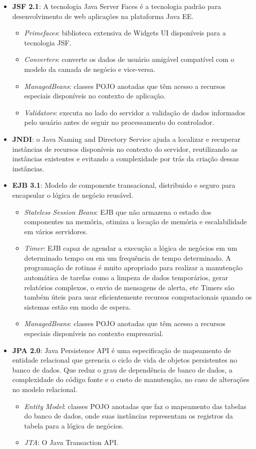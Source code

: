\documentclass[envcountsame,envcountchap,letterpaper]{svmono}
\begin{document}
\begin{itemize}
\item \textbf{JSF 2.1}: A tecnologia Java Server Faces é a tecnologia padrão para desenvolvimento de web aplicações na plataforma Java EE.
   \begin{itemize}
   \item \textit{Primefaces}: biblioteca extensiva de Widgets UI 
   disponíveis para a tecnologia JSF.
   \item \textit{Converters}: converte os dados de usuário amigável compatível com o modelo da camada de negócio e vice-versa. 
   \item \textit{ManagedBeans}: classes POJO anotadas que têm
   acesso a recursos especiais disponíveis no
   contexto de aplicação.
   \item \textit{Validators}: executa no lado do servidor a validação de dados informados pelo usuário antes de seguir no processamento do controlador.
   \end{itemize}
\item \textbf{JNDI}: o Java Naming and Directory Service ajuda a localizar e recuperar instâncias de recursos disponíveis no contexto do servidor, reutilizando as instâncias existentes e evitando a complexidade por trás da criação dessas instâncias.
\item \textbf{EJB 3.1}: Modelo de componente transacional, distribuido e seguro para encapsular o lógica de negócio reusável.
   \begin{itemize}
   \item \textit{Stateless Session Beans}: EJB que não armazena o estado dos componentes na memória, otimiza a locação de memória e escalabilidade em vários servidores.
   \item \textit{Timer}: EJB capaz de agendar a
    execução a lógica de negócios em um determinado tempo ou em um
    frequência de tempo determinado. A programação de rotinas é
    muito apropriado para realizar a manutenção automática
    de tarefas como a limpeza de dados temporários, gerar
    relatórios complexos, o envio de mensagens de alerta, etc Timers
    são também úteis para usar eficientemente recursos computacionais
    quando os sistemas estão em modo de espera.
   \item \textit{ManagedBeans}: classes POJO anotadas que têm
    acesso a recursos especiais disponíveis no contexto empresarial.
   \end{itemize}
\item \textbf{JPA 2.0}: Java Persistence API é uma especificação de mapeamento de entidade relacional que gerencia o ciclo de vida de objetos persistentes no banco de dados. Que reduz o grau de dependência de banco de dados, a complexidade do código fonte e o custo de manutenção, no caso de alterações no modelo relacional.
   \begin{itemize}
   \item \textit{Entity Model}: classes POJO anotadas que faz o mapeamento das tabelas do banco de dados, onde suas instâncias representam os registros da tabela para a lógica de negócios.
   \item \textit{JTA}: O Java Transaction API.
   \end{itemize}
\end{itemize}
\end{document}

